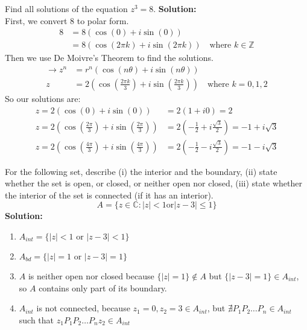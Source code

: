 \begin{example}
    Find all solutions of the equation $z^3=8$.
    \textbf{Solution:} \\
    First, we convert $8$ to polar form.
    \begin{align*}
        8 & = 8(\cos(0)+i\sin(0))                                               \\
          & = 8(\cos(2\pi k)+i\sin(2\pi k)) \quad \text{where $k\in\mathbb{Z}$}
    \end{align*}
    Then we use De Moivre's Theorem to find the solutions.
    \begin{align*}
        \rightarrow z^n & = r^n(\cos(n\theta)+i\sin(n\theta))                                              \\
        z               & = 2(\cos(\frac{2\pi k}{3})+i\sin(\frac{2\pi k}{3})) \quad \text{where $k=0,1,2$}
    \end{align*}
    So our solutions are:
    \begin{align*}
        z = 2(\cos(0)+i\sin(0))                           & = 2(1+i0) = 2                                        \\
        z = 2(\cos(\frac{2\pi}{3})+i\sin(\frac{2\pi}{3})) & = 2(-\frac{1}{2}+i\frac{\sqrt{3}}{2}) = -1+i\sqrt{3} \\
        z = 2(\cos(\frac{4\pi}{3})+i\sin(\frac{4\pi}{3})) & = 2(-\frac{1}{2}-i\frac{\sqrt{3}}{2}) = -1-i\sqrt{3}
    \end{align*}
\end{example}

\begin{example}
    For the following set, describe (i) the interior and the boundary, (ii) state whether the set is open, or closed, or neither open nor closed, (iii) state whether the interior of the set is connected (if it has an interior).
    $$A = \{z\in\mathbb{C}:|z|<1\text{or}|z-3|\leq1\}$$
    \textbf{Solution:} \\
    \begin{enumerate}
        \item $A_{int} = \{|z| < 1 \text{ or } |z - 3| < 1\}$
        \item $A_{bd} = \{|z| = 1 \text{ or } |z - 3| = 1\}$
        \item $A$ is neither open nor closed because $\{|z| = 1\} \notin A$ but $\{|z - 3| = 1\} \in A_{int}$, so $A$ contains only part of its boundary.
        \item $A_{int}$ is not connected, because $z_1 = 0, z_2 = 3 \in A_{int}$, but $\nexists P_1P_2\ldots P_n \in A_{int} $ such that $z_1P_1P_2\ldots P_nz_2 \in A_{int}$
    \end{enumerate}
\end{example}

